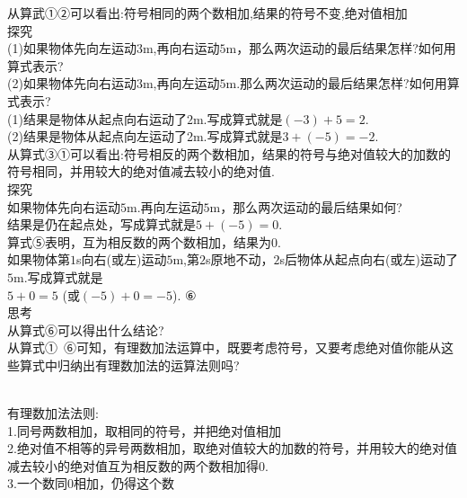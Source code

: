 \documentclass{article}
\begin{document}
从算武①②可以看出:符号相同的两个数相加,结果的符号不变,绝对值相加\\

探究\\

(1)如果物体先向左运动$3$m,再向右运动$5$m，那么两次运动的最后结果怎样?如何用算式表示?\\ 
(2)如果物体先向右运动$3$m,再向左运动$5$m.那么两次运动的最后结果怎样?如何用算式表示?\\

(1)结果是物体从起点向右运动了$2$m.写成算式就是$(-3)+5=2$.\\
(2)结果是物体从起点向左运动了2m.写成算式就是$3+(-5)=-2$.\\

从算式③①可以看出:符号相反的两个数相加，结果的符号与绝对值较大的加数的符号相同，并用较大的绝对值减去较小的绝对值.\\

探究\\

如果物体先向右运动$5$m.再向左运动$5$m，那么两次运动的最后结果如何?\\

结果是仍在起点处，写成算式就是$5+(-5)=0$.\\

算式⑤表明，互为相反数的两个数相加，结果为0.\\

如果物体第$1$s向右(或左)运动$5$m,第$2$s原地不动，$2$s后物体从起点向右(或左)运动了$5$m.写成算式就是\\

$5+0=5$ (或$(-5)+0= -5$).  ⑥\\

思考\\

从算式⑥可以得出什么结论?\\

从算式①~⑥可知，有理数加法运算中，既要考虑符号，又要考虑绝对值你能从这些算式中归纳出有理数加法的运算法则吗?\\

\begin{propertory}\\
有理数加法法则:\\

1.同号两数相加，取相同的符号，并把绝对值相加\\

2.绝对值不相等的异号两数相加，取绝对值较大的加数的符号，并用较大的绝对值减去较小的绝对值互为相反数的两个数相加得0.\\

3.一个数同0相加，仍得这个数\\
\end{propertory}\\
\end{document}
